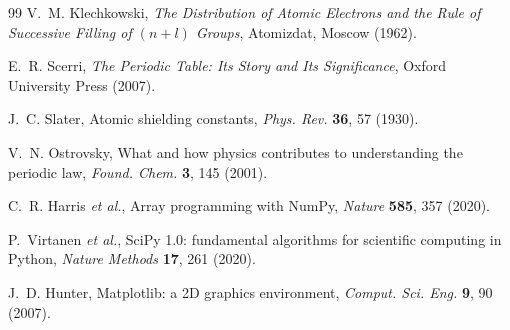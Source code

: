 \documentclass[11pt,a4paper]{article}
\theoremstyle{definition}
\begin{document}
\begin{thebibliography}{99}
 V.~M. Klechkowski, \emph{The Distribution of Atomic
Electrons and the Rule of Successive Filling of $(n+l)$ Groups}, Atomizdat,
Moscow (1962).

 E.~R. Scerri, \emph{The Periodic Table: Its Story and Its
Significance}, Oxford University Press (2007).

 J.~C. Slater, Atomic shielding constants, \emph{Phys. Rev.}
\textbf{36}, 57 (1930).

 V.~N. Ostrovsky, What and how physics contributes to
understanding the periodic law, \emph{Found. Chem.} \textbf{3}, 145 (2001).

 C.~R. Harris \emph{et al.}, Array programming with NumPy,
\emph{Nature} \textbf{585}, 357 (2020).

 P.~Virtanen \emph{et al.}, SciPy 1.0: fundamental algorithms for
scientific computing in Python, \emph{Nature Methods} \textbf{17}, 261 (2020).

 J.~D. Hunter, Matplotlib: a 2D graphics environment,
\emph{Comput. Sci. Eng.} \textbf{9}, 90 (2007).

\end{thebibliography}

\vspace{4mm}
\end{document}

